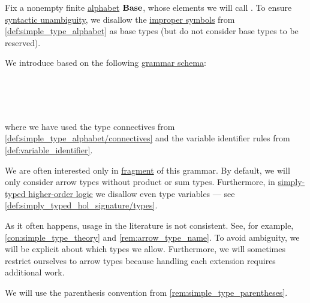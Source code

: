 \begin{definition}\label{def:simple_type}\mimprovised
  Fix a nonempty finite \hyperref[def:formal_language/alphabet]{alphabet} \( \op*{Base} \), whose elements we will call . To ensure \hyperref[def:grammar_ambiguity]{syntactic unambiguity}, we disallow the \hyperref[con:improper_symbol]{improper symbols} from \cref{def:simple_type_alphabet} as base types (but do not consider base types to be reserved).

  We introduce  based on the following \hyperref[def:formal_grammar/schema]{grammar schema}:
  \begin{bnf*}
       {} \\
         { \bnfor {}} \\
          {\bnftsq{(} \bnfsp {} \bnfsp {} \bnfsp {} \bnfsp \bnftsq{)}} \\
                { \bnfor {}}
  \end{bnf*}
  where we have used the type connectives from \cref{def:simple_type_alphabet/connectives} and the variable identifier rules from \cref{def:variable_identifier}.

  We are often interested only in \hyperref[con:syntax_fragment]{fragment} of this grammar. By default, we will only consider arrow types without product or sum types. Furthermore, in \hyperref[def:simply_typed_hol]{simply-typed higher-order logic} we disallow even type variables --- see \cref{def:simply_typed_hol_signature/types}.
\end{definition}
\begin{comments}
  \item As it often happens, usage in the literature is not consistent. See, for example, \cref{con:simple_type_theory} and \cref{rem:arrow_type_name}. To avoid ambiguity, we will be explicit about which types we allow. Furthermore, we will sometimes restrict ourselves to arrow types because handling each extension requires additional work.

  \item We will use the parenthesis convention from \cref{rem:simple_type_parentheses}.
\end{comments}

